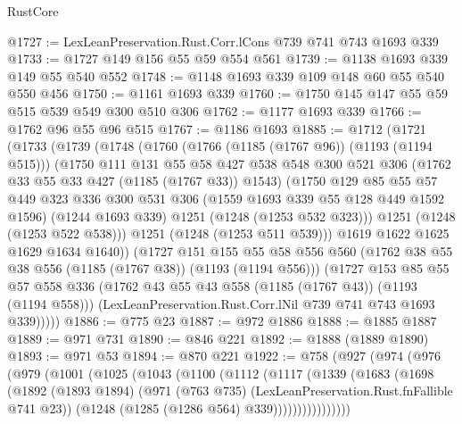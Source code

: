 \begin{lexlean}{RustCore}
\begin{coremodule}
@1727 := LexLeanPreservation.Rust.Corr.lCons @739 @741 @743 @1693 @339
@1733 := @1727 @149 @156 @55 @59 @554 @561
@1739 := @1138 @1693 @339 @149 @55 @540 @552
@1748 := @1148 @1693 @339 @109 @148 @60 @55 @540 @550 @456
@1750 := @1161 @1693 @339
@1760 := @1750 @145 @147 @55 @59 @515 @539 @549 @300 @510 @306
@1762 := @1177 @1693 @339
@1766 := @1762 @96 @55 @96 @515
@1767 := @1186 @1693
@1885 := @1712
    (@1721
      (@1733
        (@1739
          (@1748
            (@1760
              (@1766 (@1185 (@1767 @96)) (@1193 (@1194 @515)))
              (@1750
                @111
                @131
                @55
                @58
                @427
                @538
                @548
                @300
                @521
                @306
                (@1762 @33 @55 @33 @427 (@1185 (@1767 @33)) @1543)
                (@1750
                  @129
                  @85
                  @55
                  @57
                  @449
                  @323
                  @336
                  @300
                  @531
                  @306
                  (@1559 @1693 @339 @55 @128 @449 @1592 @1596)
                  (@1244 @1693 @339)
                  @1251
                  (@1248 (@1253 @532 @323)))
                @1251
                (@1248 (@1253 @522 @538)))
              @1251
              (@1248 (@1253 @511 @539)))
            @1619
            @1622
            @1625
            @1629
            @1634
            @1640))
        (@1727
          @151
          @155
          @55
          @58
          @556
          @560
          (@1762 @38 @55 @38 @556 (@1185 (@1767 @38)) (@1193 (@1194 @556)))
          (@1727
            @153
            @85
            @55
            @57
            @558
            @336
            (@1762 @43 @55 @43 @558 (@1185 (@1767 @43)) (@1193 (@1194 @558)))
            (LexLeanPreservation.Rust.Corr.lNil @739 @741 @743 @1693 @339)))))
@1886 := @775 @23
@1887 := @972 @1886
@1888 := @1885 @1887
@1889 := @971 @731
@1890 := @846 @221
@1892 := @1888 (@1889 @1890)
@1893 := @971 @53
@1894 := @870 @221
@1922 := @758
    (@927
      (@974
        (@976
          (@979
            (@1001
              (@1025
                (@1043
                  (@1100
                    (@1112
                      (@1117
                        (@1339
                          (@1683
                            (@1698
                              (@1892
                                (@1893 @1894)
                                (@971 (@763 @735) (LexLeanPreservation.Rust.fnFallible @741 @23))
                                (@1248 (@1285 (@1286 @564) @339))))))))))))))))

\end{coremodule}
\end{lexlean}
